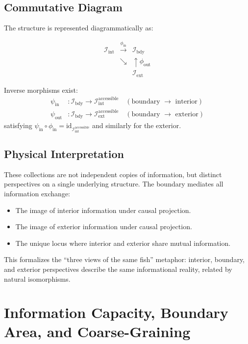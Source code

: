 ﻿\documentclass[12pt]{article}
\begin{document}
\subsection{Commutative Diagram}


The structure is represented diagrammatically as:


\[
\begin{array}{ccc}
\mathcal{I}_{\mathrm{int}} & \xrightarrow{\phi_{\mathrm{in}}} & \mathcal{I}_{\mathrm{bdy}} \\
 & \searrow & \uparrow \phi_{\mathrm{out}} \\
 & & \mathcal{I}_{\mathrm{ext}}
\end{array}
\]


Inverse morphisms exist:
\begin{align*}
    \psi_{\mathrm{in}} &: \mathcal{I}_{\mathrm{bdy}} \to \mathcal{I}_{\mathrm{int}}^{\mathrm{accessible}} \quad (\text{boundary $\to$ interior}) \\
    \psi_{\mathrm{out}} &: \mathcal{I}_{\mathrm{bdy}} \to \mathcal{I}_{\mathrm{ext}}^{\mathrm{accessible}} \quad (\text{boundary $\to$ exterior})
\end{align*}
satisfying $\psi_{\mathrm{in}} \circ \phi_{\mathrm{in}} = \mathrm{id}_{\mathcal{I}_{\mathrm{int}}^{\mathrm{accessible}}}$ and similarly for the exterior.


\subsection{Physical Interpretation}


These collections are not independent copies of information, but distinct perspectives on a single underlying structure. The boundary mediates all information exchange:


\begin{itemize}
    \item The image of interior information under causal projection.
    \item The image of exterior information under causal projection.
    \item The unique locus where interior and exterior share mutual information.
\end{itemize}


This formalizes the ``three views of the same fish'' metaphor: interior, boundary, and exterior perspectives describe the same informational reality, related by natural isomorphisms.


\section{Information Capacity, Boundary Area, and Coarse-Graining}
\end{document}
